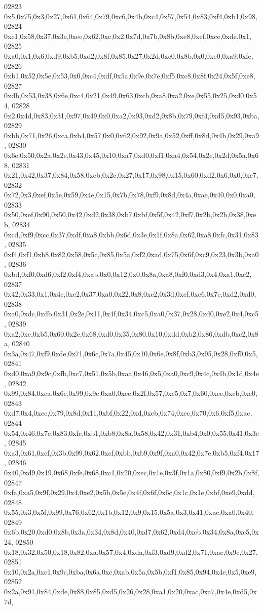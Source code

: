 \begin{DoxyCode}
02823   0x5,0x75,0x3,0x27,0x61,0x64,0x79,0xc6,0x4b,0xc4,0x57,0x54,0x83,0xf4,0xb1,0x98,
02824   0xe1,0x58,0x37,0x3e,0xee,0x62,0xc,0x2,0x7d,0x7b,0x8b,0xe8,0xef,0xce,0xde,0x1,
02825   0xa0,0x1,0x6,0xd9,0xb5,0xd2,0x8f,0x85,0x27,0x2d,0xc0,0x8b,0x0,0xe0,0xa9,0xfe,
02826   0xb1,0x52,0x5e,0x53,0x0,0xc4,0xdf,0x5a,0x9e,0x7e,0xf5,0xc8,0x8f,0x24,0x5f,0xe8,
02827   0xdb,0x53,0x38,0x6e,0xc4,0x21,0x49,0x63,0xcb,0xa8,0xa2,0xe,0x55,0x25,0xd0,0x54,
02828   0x2,0x4d,0x83,0x31,0x97,0x49,0x0,0xa2,0x93,0xd2,0x8b,0x79,0xf4,0xd5,0x93,0xba,
02829   0xbb,0x71,0x26,0xca,0xb4,0x57,0x0,0x62,0x92,0x9a,0x52,0xff,0x8d,0x4b,0x29,0xa9,
02830   0x6e,0x50,0x2a,0x2e,0x43,0x45,0x10,0xa7,0xd0,0xf1,0xa4,0x54,0x2e,0x2d,0x5a,0x68,
02831   0x21,0x42,0x37,0x84,0x58,0xeb,0x2c,0x27,0x17,0x98,0x15,0x60,0xd2,0x6,0x0,0xc7,
02832   0x72,0x3,0xef,0x5e,0x59,0x4e,0x15,0x7b,0x78,0xf9,0x8d,0x4a,0xae,0x40,0x0,0xa0,
02833   0x50,0xef,0x90,0x50,0x42,0xd2,0x38,0xb7,0xbf,0x5f,0x42,0xf7,0x2b,0x2b,0x38,0xeb,
02834   0xcd,0xf9,0xcc,0x37,0xdf,0xa8,0xbb,0x6d,0x3e,0x1f,0x8a,0x62,0xa8,0xfc,0x31,0x83,
02835   0xf4,0xf1,0xb8,0x82,0x58,0x5c,0x85,0x5a,0xf2,0xad,0x75,0x6f,0xc9,0x23,0x3b,0xa0,
02836   0xbd,0xf0,0xd6,0xf2,0xf4,0xab,0x0,0x12,0x0,0x8a,0xa8,0xf0,0xd3,0x4,0xa1,0xc2,
02837   0x42,0x33,0x1,0x4c,0xe2,0x37,0xa0,0x22,0x8,0xe2,0x3d,0xef,0xe6,0x7e,0xd2,0xd0,
02838   0xa0,0xdc,0xdb,0x31,0x2e,0x11,0x4f,0x34,0xc5,0xa0,0x37,0x28,0xd0,0xe2,0x4,0xc5,
02839   0xa2,0xe,0xb5,0x60,0x2c,0x68,0xd0,0x35,0x80,0x10,0xdd,0xb2,0x86,0xdb,0xc2,0x8a,
02840   0x3a,0x47,0xf9,0xde,0x71,0x6c,0x7a,0x45,0x10,0x6e,0x8f,0xb3,0x95,0x28,0xf0,0x5,
02841   0xd0,0xa9,0x9c,0xfb,0xc7,0x51,0x5b,0xaa,0x46,0x5,0xa0,0xc9,0x4c,0x4b,0x1d,0x4e,
02842   0x99,0x84,0xca,0x6c,0x99,0x9c,0xa0,0xee,0x2f,0x57,0xc5,0x7,0x60,0xee,0xcb,0xc0,
02843   0xd7,0x4,0xec,0x79,0x8d,0x11,0xbf,0x22,0xd,0xeb,0x74,0xec,0x70,0x6,0xf5,0xac,
02844   0x54,0x46,0x7e,0x83,0xfc,0xb1,0xb8,0x8a,0x58,0x42,0x31,0xb4,0x0,0x55,0x41,0x3e,
02845   0xa3,0x61,0xef,0x3b,0x99,0x62,0xcf,0xbb,0xb9,0x9f,0xa0,0x42,0x7e,0xb5,0xf4,0x17,
02846   0x40,0xd9,0x19,0x68,0xfe,0x68,0xc1,0x20,0xec,0x1e,0x3f,0x1a,0x80,0xf9,0x2b,0x8f,
02847   0xfa,0xa5,0x9f,0x29,0x4,0xe2,0x5b,0x5e,0x4f,0x6f,0x6c,0x1c,0x1e,0xbf,0xe9,0xdd,
02848   0x55,0x3,0x5f,0x99,0x76,0x62,0x1b,0x12,0x9,0x15,0x5a,0x3,0x41,0xac,0xa0,0x40,
02849   0x6b,0x20,0xd0,0x8b,0x3a,0x34,0x8d,0x40,0xd7,0x62,0xd4,0xcb,0x34,0x8a,0xc5,0x24,
02850   0x18,0x32,0x50,0x18,0x82,0xa,0x57,0x4,0xda,0xf3,0xd9,0xd2,0x71,0xae,0x9c,0x27,
02851   0x10,0x2a,0xe1,0x9c,0xba,0x6a,0xc,0xab,0x5a,0x5b,0xf1,0x85,0x94,0x4e,0x5,0xe9,
02852   0x2a,0x91,0x84,0xde,0x88,0x85,0xd5,0x26,0x28,0xa1,0x20,0xac,0xa7,0x4e,0xd5,0x7d,

\end{DoxyCode}
